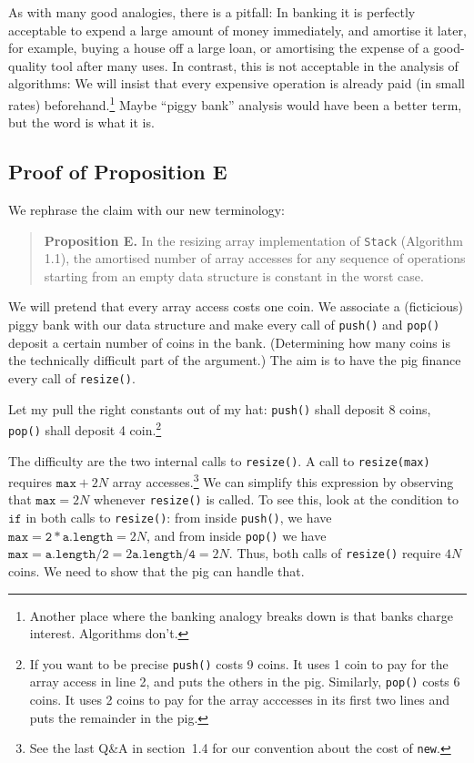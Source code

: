 \documentclass{tufte-handout}
\begin{document}
As with many good analogies, there is a pitfall: 
In banking it is perfectly acceptable to expend a large amount of
money immediately, and amortise it later, for example, buying a house
off a large loan, or amortising the expense of a good-quality tool
after many uses.
In contrast, this is not acceptable in the analysis of algorithms:
We will insist that every expensive operation is already paid (in
small rates) beforehand.\footnote{Another place where the banking
  analogy breaks down is that banks charge interest. Algorithms don't.}
Maybe ``piggy bank'' analysis would have been a better term, but the
word is what it is.


\subsection*{Proof of Proposition E}

We rephrase the claim with our new terminology:

   
\begin{quote}{\bf\sf Proposition E.} 
  In the resizing array implementation of {\tt Stack} (Algorithm 1.1),
  the amortised number of array accesses for any sequence of
  operations starting from an empty data structure is constant in the
  worst case. 
\end{quote}

We will pretend that every array access costs one coin.  We associate
a (ficticious) piggy bank with our data structure and make every call
of {\tt push()} and {\tt pop()} deposit a certain number of coins in
the bank. (Determining how many coins is the technically difficult
part of the argument.) 
The aim is to have the pig finance every call of {\tt resize()}.

Let my pull the right constants out of my hat: {\tt push()} shall
deposit 8 coins, {\tt pop()} shall deposit 4 coin.\footnote{If you
  want to be precise {\tt push()} costs 9 coins. It uses 1 coin to pay
  for the array access in line 2, and puts the others in the
  pig. Similarly, {\tt pop()} costs 6 coins. It uses 2 coins to pay
  for the array acccesses in its first two lines and puts the
  remainder in the pig.}

The difficulty are the two internal calls to {\tt resize()}.  
A call to {\tt resize(max)} requires $\mathtt{max}+ 2N$ array
accesses.\footnote{See the last Q\&A in section~1.4 for our convention
  about the cost of {\tt new}.}  
We can simplify this expression by observing that $\mathtt{max}=2N$
whenever {\tt resize()} is called.
To see this, look at the condition to $\mathtt{if}$ in both calls to
\texttt{resize()}: from inside \texttt{push()}, we have $\mathtt{max}=
\mathtt{2*a.length} = 2N$, and from inside \texttt{pop()} we have
$\mathtt{max}= \mathtt{a.length/2}= 2 \mathtt{a.length/4} = 2N$.
Thus, both calls of {\tt resize()} require $4N$ coins.  
We need to show that the pig can handle that.
\end{document}
